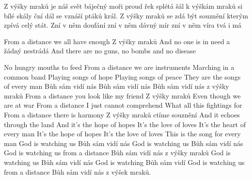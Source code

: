 Z výšky mraků je náš svět báječný
moři proud řek splétá šál
k výškám mraků si bílé skály ční 
dál se vznáší ptáků král.
Z výšky mraků se zdá být souznění
kterým zpívá celý stát.
Zní v něm doufání
zní v něm dávný mír
zní v něm víra tvá i má

From a distance we all have enough
Z výšky mraků
And no one is in need
a žádný nestrádá
And there are no guns, no bombs and no disease

No hungry mouths to feed
From a distance we are instruments
Marching in a common band
Playing songs of hope
Playing songs of peace
They are the songs of every man
Bůh sám vidí nás
Bůh sám vidí nás
Bůh sám vidí nás z výšky mraků
From a distance you look like my friend
Z výšky mraků
Even though we are at war
From a distance I just cannot comprehend
What all this fightings for
From a distance there is harmony
Z výšky mraků ctíme souznění
And it echoes through the land
And it's the hope of hopes
It's the love of loves
It's the heart of every man
It's the hope of hopes
It's the love of loves
This is the song for every man
God is watching us
Bůh sám vidí nás
God is watching us
Bůh sám vidí nás
God is watching us from a distance
Bůh sám vidí nás z výšky mraků
God is watching us
Bůh sám vidí nás
God is watching
Bůh sám vidí
God is watching us from a distance
Bůh sám vidí nás z výšek mraků.
